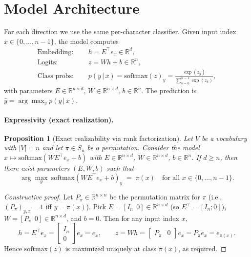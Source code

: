 \documentclass[12pt]{article}
\theoremstyle{plain}
\newtheorem{proposition}{Proposition}            %
\theoremstyle{remark}
\begin{document}
\section{Model Architecture}
For each direction we use the same per-character classifier. Given input index $x\in\{0,\dots,n-1\}$, the model computes
\begin{align}
\text{Embedding: } & \quad h = E^\top e_x \in \mathbb{R}^d, \\
\text{Logits: } & \quad z = W h + b \in \mathbb{R}^{n}, \\
\text{Class probs: } & \quad p(y\,|\,x) = \mathrm{softmax}(z)_y = \frac{\exp(z_y)}{\sum_{k=0}^{n-1}\exp(z_k)},
\end{align}
with parameters $E\in\mathbb{R}^{n\times d}$, $W\in\mathbb{R}^{n\times d}$, $b\in\mathbb{R}^{n}$. The prediction is $\hat{y}=\arg\max_y p(y\,|\,x)$.

\paragraph{Expressivity (exact realization).}
\begin{proposition}[Exact realizability via rank factorization]
Let $V$ be a vocabulary with $|V|=n$ and let $\pi\in S_n$ be a permutation.
Consider the model $x\mapsto \mathrm{softmax}(W E^\top e_x + b)$ with
$E\in\mathbb{R}^{n\times d}$, $W\in\mathbb{R}^{n\times d}$, $b\in\mathbb{R}^n$.
If $d\ge n$, then there exist parameters $(E,W,b)$ such that
\[
\arg\max_y \ \mathrm{softmax}(W E^\top e_x + b)_y \;=\; \pi(x)
\quad\text{for all } x\in\{0,\dots,n-1\}.
\]
\end{proposition}

\begin{proof}[Constructive proof]
Let $P_\pi\in\mathbb{R}^{n\times n}$ be the permutation matrix for $\pi$
(i.e., $(P_\pi)_{y,x}=1$ iff $y=\pi(x)$).
Pick $E=[I_n\ \ 0]\in\mathbb{R}^{n\times d}$ (so $E^\top=[I_n; 0]$),
$W=[P_\pi\ \ 0]\in\mathbb{R}^{n\times d}$, and $b=0$.
Then for any input index $x$,
\[
h = E^\top e_x = \begin{bmatrix} I_n \\ 0 \end{bmatrix} e_x = e_x,
\qquad
z = W h = \begin{bmatrix} P_\pi & 0 \end{bmatrix} e_x = P_\pi e_x = e_{\pi(x)}.
\]
Hence $\mathrm{softmax}(z)$ is maximized uniquely at class $\pi(x)$, as required.
\end{proof}
\end{document}

